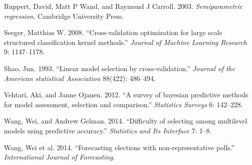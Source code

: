 Ruppert, David, Matt P Wand, and Raymond J Carroll. 2003.
\emph{Semiparametric regression}. Cambridge University Press.

Seeger, Matthias W. 2008. ``Cross-validation optimization for large
scale structured classification kernel methods.'' \emph{Journal of
Machine Learning Research} 9: 1147--1178.

Shao, Jun. 1993. ``Linear model selection by cross-validation.''
\emph{Journal of the American statistical Association} 88(422):
486--494.

Vehtari, Aki, and Janne Ojanen. 2012. ``A survey of bayesian predictive
methods for model assessment, selection and comparison.''
\emph{Statistics Surveys} 6: 142--228.

Wang, Wei, and Andrew Gelman. 2014. ``Difficulty of selecting among
multilevel models using predictive accuracy.'' \emph{Statistics and Its
Interface} 7: 1--8.

Wang, Wei et al. 2014. ``Forecasting elections with non-representative
polls.'' \emph{International Journal of Forecasting}.
